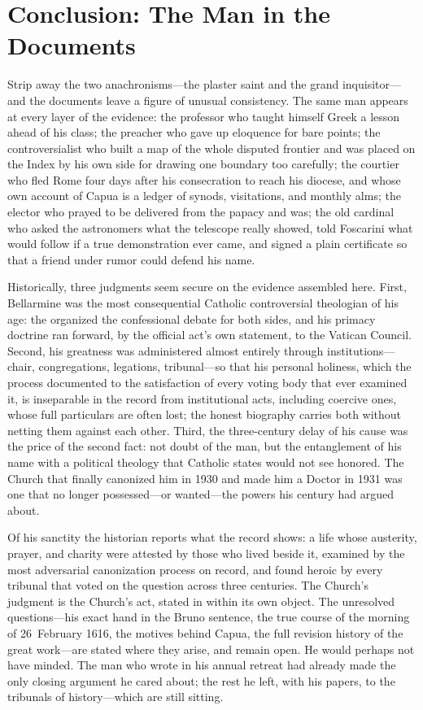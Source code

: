 \section{Conclusion: The Man in the Documents}

Strip away the two anachronisms---the plaster saint and the
grand inquisitor---and the documents leave a figure of unusual
consistency. The same man appears at every layer of the evidence:
the professor who taught himself Greek a lesson ahead of his
class; the preacher who gave up eloquence for bare points; the
controversialist who built a map of the whole disputed frontier
and was placed on the Index by his own side for drawing one
boundary too carefully; the courtier who fled Rome four days
after his consecration to reach his diocese, and whose own
account of Capua is a ledger of synods, visitations, and monthly
alms; the elector who prayed to be delivered from the papacy and
was; the old cardinal who asked the astronomers what the
telescope really showed, told Foscarini what would follow if a
true demonstration ever came, and signed a plain certificate so
that a friend under rumor could defend his name.

Historically, three judgments seem secure on the evidence
assembled here. First, Bellarmine was the most consequential
Catholic controversial theologian of his age: the
 organized the confessional debate for both
sides, and his primacy doctrine ran forward, by the official act's
own statement, to the Vatican Council. Second, his greatness was
administered almost entirely through institutions---chair,
congregations, legations, tribunal---so that his personal
holiness, which the process documented to the satisfaction of
every voting body that ever examined it, is inseparable in the
record from institutional acts, including coercive ones, whose
full particulars are often lost; the honest biography carries
both without netting them against each other. Third, the
three-century delay of his cause was the price of the second
fact: not doubt of the man, but the entanglement of his name with
a political theology that Catholic states would not see honored.
The Church that finally canonized him in 1930 and made him a
Doctor in 1931 was one that no longer possessed---or
wanted---the powers his century had argued about.

Of his sanctity the historian reports what the record shows: a
life whose austerity, prayer, and charity were attested by those
who lived beside it, examined by the most adversarial
canonization process on record, and found heroic by every
tribunal that voted on the question across three centuries. The
Church's judgment is the Church's act, stated in 
within its own object. The unresolved questions---his exact hand
in the Bruno sentence, the true course of the morning of
26~February 1616, the motives behind Capua, the full revision
history of the great work---are stated where they arise, and
remain open. He would perhaps not have minded. The man who wrote
 in his annual retreat had already
made the only closing argument he cared about; the rest he left,
with his papers, to the tribunals of history---which are still
sitting.

